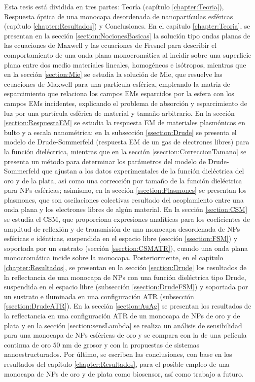Esta tesis está dividida en tres partes: Teoría (capítulo \ref{chapter:Teoria}), Respuesta óptica de una monocapa desordenada de nanopartículas esféricas (capítulo \ref{chapter:Resultados}) y Conclusiones. En el capítulo \ref{chapter:Teoria}, se presentan en la sección \ref{section:NocionesBasicas} la solución tipo ondas planas de las ecuaciones de Maxwell y las ecuaciones de Fresnel para describir el comportamiento de una onda plana monocromática al incidir sobre una superficie plana entre dos medio materiales lineales, homogéneos e isótropos, mientras que en la sección \ref{section:Mie} se estudia la solución de Mie, que resuelve las ecuaciones de Maxwell para una partícula esférica, empleando la matriz de esparcimiento que relaciona los campos EMs esparcidos por la esfera con los campos EMs incidentes, explicando el problema de absorción y esparcimiento de luz por una partícula esférica de material y tamaño arbitrario. En la sección \ref{section:RespuestaEM} se estudia la respuesta EM de materiales plasmónicos en bulto y a escala nanométrica: en la subsección \ref{ssection:Drude} se presenta el modelo de Drude-Sommerfeld (respuesta EM de un gas de electrones libres) para la función dieléctrica, mientras que en la sección \ref{ssection:CorreccionTamano} se presenta un método para determinar los parámetros del modelo de Drude-Sommerfeld que ajustan a los datos experimentales de la función dieléctrica del oro y de la plata, así como una corrección por tamaño de la función dieléctrica para NPs esféricas; asimismo, en la sección \ref{ssection:Plasmones} se presentan los plasmones, que son oscilaciones colectivas resultado del acoplamiento entre una onda plana y los electrones libres de algún material. En la  sección \ref{section:CSM} se estudia el CSM, que proporciona expresiones analíticas para los  coeficientes de amplitud de reflexión y de transmisión de una monocapa desordenada de NPs esféricas e idénticas, suspendida en el espacio libre (sección \ref{ssection:FSM}) y  soportada por un sustrato (sección \ref{ssection:CSMATR}), cuando una onda plana monocromática incide sobre la monocapa. Posteriormente, en el capítulo \ref{chapter:Resultados}, se presentan en la sección \ref{section:Drude} los resultados de la reflectancia de una monocapa de NPs con una función dieléctrica tipo Drude, suspendida en el espacio libre (subsección \ref{ssection:DrudeFSM}) y soportada por un sustrato e iluminada en una configuración ATR (subsección \ref{ssection:DrudeATR}). En la sección \ref{section:AuAg} se presentan los resultados de la reflectancia en una configuración ATR de un monocapa de NPs de oro y de plata y en la sección \ref{section:sensLambda} se realiza un análisis de sensibilidad para una monocapa de NPs esféricas de oro y se compara con la de una película continua de oro $50$ nm de grosor y con la propuestas de sistemas nanoestructurados. Por último, se escriben las conclusiones, con base en los resultados del capítulo \ref{chapter:Resultados}, para el posible empleo de una monocapa de NPs de oro y de plata como biosensor, así como trabajo a futuro.

